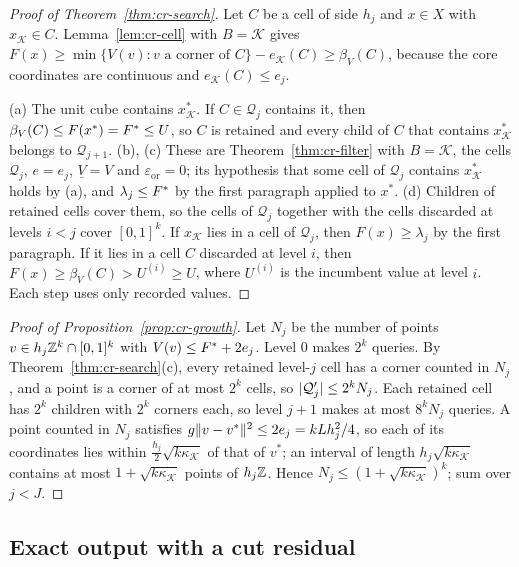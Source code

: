 \begin{proof}[Proof of Theorem~\ref{thm:cr-search}]
Let $C$ be a cell of side $h_j$ and $x\in X$ with $x_{\mathcal K}\in C$.
Lemma~\ref{lem:cr-cell} with $B=\mathcal K$ gives
$F(x)\ge\min\{V(v):v\text{ a corner of }C\}-e_{\mathcal K}(C)\ge\beta_V(C)$,
because the core coordinates are continuous and $e_{\mathcal K}(C)\le e_j$.

(a) The unit cube contains $x^*_{\mathcal K}$. If $C\in\mathcal Q_j$ contains
it, then $\beta_V(C)\le F(x^*)=F^{*}\le U$, so $C$ is retained and every
child of $C$ that contains $x^*_{\mathcal K}$ belongs to $\mathcal Q_{j+1}$.
(b), (c) These are Theorem~\ref{thm:cr-filter} with $B=\mathcal K$, the
cells $\mathcal Q_j$, $e=e_j$, $\underline V=V$ and $\varepsilon_{\mathrm{or}}=0$; its hypothesis
that some cell of $\mathcal Q_j$ contains $x^*_{\mathcal K}$ holds by (a), and
$\lambda_j\le F^{*}$ by the first paragraph applied to $x^*$.
(d) Children of retained cells cover them, so the cells of $\mathcal Q_j$
together with the cells discarded at levels $i<j$ cover $[0,1]^k$. If
$x_{\mathcal K}$ lies in a cell of $\mathcal Q_j$, then $F(x)\ge\lambda_j$ by
the first paragraph. If it lies in a cell $C$ discarded at level $i$, then
$F(x)\ge\beta_V(C)>U^{(i)}\ge U$, where $U^{(i)}$ is the incumbent value at
level $i$. Each step uses only recorded values.
\end{proof}

\begin{proof}[Proof of Proposition~\ref{prop:cr-growth}]
Let $N_j$ be the number of points $v\in h_j\mathbb Z^k\cap[0,1]^k$ with
$V(v)\le F^{*}+2e_j$. Level $0$ makes $2^k$ queries. By
Theorem~\ref{thm:cr-search}(c), every retained level-$j$ cell has a corner
counted in $N_j$, and a point is a corner of at most $2^k$ cells, so
$\lvert \mathcal Q_j'\rvert\le2^kN_j$. Each retained cell has $2^k$ children with
$2^k$ corners each, so level $j+1$ makes at most $8^kN_j$ queries. A point
counted in $N_j$ satisfies $g\lVert v-v^*\rVert^2\le2e_j=kLh_j^2/4$, so each of
its coordinates lies within $\frac{h_j}2\sqrt{k\kappa_{\mathcal K}}$ of that
of $v^*$; an interval of length $h_j\sqrt{k\kappa_{\mathcal K}}$ contains at
most $1+\sqrt{k\kappa_{\mathcal K}}$ points of $h_j\mathbb Z$. Hence
$N_j\le(1+\sqrt{k\kappa_{\mathcal K}})^k$; sum over $j<J$.
\end{proof}

\subsection{Exact output with a cut residual}

